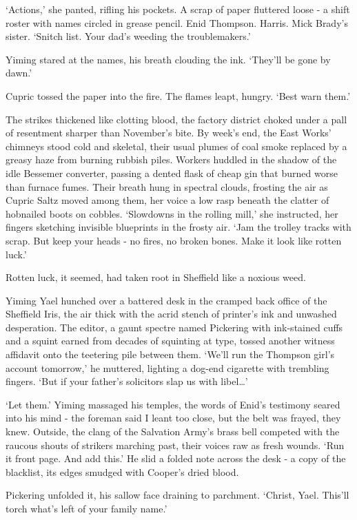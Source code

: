 `Actions,' she panted, rifling his pockets. A scrap of paper fluttered loose - a shift roster with names circled in grease pencil. Enid Thompson. Harris. Mick Brady's sister. `Snitch list. Your dad's weeding the troublemakers.'

Yiming stared at the names, his breath clouding the ink. `They'll be gone by dawn.'

Cupric tossed the paper into the fire. The flames leapt, hungry. `Best warn them.'

The strikes thickened like clotting blood, the factory district choked under a pall of resentment sharper than November's bite. By week's end, the East Works' chimneys stood cold and skeletal, their usual plumes of coal smoke replaced by a greasy haze from burning rubbish piles. Workers huddled in the shadow of the idle Bessemer converter, passing a dented flask of cheap gin that burned worse than furnace fumes. Their breath hung in spectral clouds, frosting the air as Cupric Saltz moved among them, her voice a low rasp beneath the clatter of hobnailed boots on cobbles. `Slowdowns in the rolling mill,' she instructed, her fingers sketching invisible blueprints in the frosty air. `Jam the trolley tracks with scrap. But keep your heads - no fires, no broken bones. Make it look like rotten luck.'

Rotten luck, it seemed, had taken root in Sheffield like a noxious weed.

Yiming Yael hunched over a battered desk in the cramped back office of the Sheffield Iris, the air thick with the acrid stench of printer's ink and unwashed desperation. The editor, a gaunt spectre named Pickering with ink-stained cuffs and a squint earned from decades of squinting at type, tossed another witness affidavit onto the teetering pile between them. `We'll run the Thompson girl's account tomorrow,' he muttered, lighting a dog-end cigarette with trembling fingers. `But if your father's solicitors slap us with libel\dots'

`Let them.' Yiming massaged his temples, the words of Enid's testimony seared into his mind - the foreman said I leant too close, but the belt was frayed, they knew. Outside, the clang of the Salvation Army's brass bell competed with the raucous shouts of strikers marching past, their voices raw as fresh wounds. `Run it front page. And add this.' He slid a folded note across the desk - a copy of the blacklist, its edges smudged with Cooper's dried blood.

Pickering unfolded it, his sallow face draining to parchment. `Christ, Yael. This'll torch what's left of your family name.'

